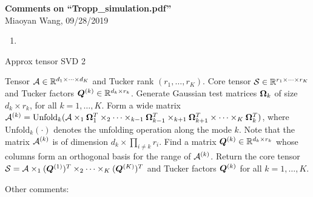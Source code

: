 \documentclass[10pt]{article}
\begin{document}
\begin{center}
{\bf \large Comments on ``Tropp\_simulation.pdf''}\\
Miaoyan Wang, 09/28/2019
\end{center}
\begin{enumerate}
\item  
\end{enumerate}
\begin{algorithm}[H]
\caption{Approx tensor SVD 2}\label{alg:B}
\begin{algorithmic}[1]
\INPUT Tensor $\mathcal{A}\in \mathbb{R}^{d_1\times \cdots \times d_K}$ and Tucker rank $(r_1,\ldots,r_K)$.
\OUTPUT Core tensor $\mathcal{S}\in\mathbb{R}^{r_1\times \cdots \times r_K}$ and Tucker factors $\bm{Q}^{(k)}\in\mathbb{R}^{d_k\times r_k}$.
 Generate Gaussian test matrices $\bm \Omega_k$ of size $d_k\times r_k$, for all $k=1,\ldots,K$.
\State Form a wide matrix $\mathcal{A}^{(k)}=\text{Unfold}_{k}(\mathcal{A}\times_1 \bm \Omega^T_1\times_2 \cdots \times_{k-1}\bm \Omega^T_{k-1}\times_{k+1}\bm \Omega^T_{k+1}\times \cdots\times_K \bm \Omega^T_k)$, where $\text{Unfold}_k(\cdot)$ denotes the unfolding operation along the mode $k$. Note that the matrix $\mathcal{A}^{(k)}$ is of dimension $d_k\times \prod_{i\neq k}r_i$.
\State Find a matrix $\bm{Q}^{(k)}\in\mathbb{R}^{d_k\times r_k}$ whose columns form an orthogonal basis for the range of $\mathcal{A}^{(k)}$. 
\EndFor
\State Return the core tensor $\mathcal{S}=\mathcal{A}\times_1(\bm{Q}^{(1)})^T\times_2\cdots\times_K(\bm{Q}^{(K)})^T$ and Tucker factors $\bm{Q}^{(k)}$ for all $k=1,\ldots,K$.
\end{algorithmic}
\end{algorithm}

Other comments:
\end{document}
